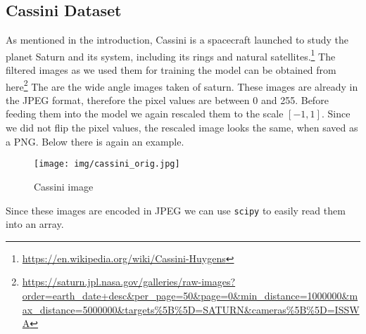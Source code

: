 \subsection{Cassini Dataset}
%
As mentioned in the introduction, Cassini is a spacecraft launched to study the planet Saturn and its system, including its rings and natural satellites.\footnote{\url{https://en.wikipedia.org/wiki/Cassini-Huygens}}
%
The filtered images as we used them for training the model can be obtained from here\footnote{\url{https://saturn.jpl.nasa.gov/galleries/raw-images?order=earth_date+desc&per_page=50&page=0&min_distance=1000000&max_distance=5000000&targets\%5B\%5D=SATURN&cameras\%5B\%5D=ISSWA}}
%
The are the wide angle images taken of saturn.
%
These images are already in the JPEG format, therefore the pixel values are between 0 and 255.
%
Before feeding them into the model we again rescaled them to the scale $[-1, 1]$.
%
Since we did not flip the pixel values, the rescaled image looks the same, when saved as a PNG.
%
Below there is again an example.
%
\begin{figure}[H]
	\centering
	\begin{minipage}{0.45\textwidth}
		\centering
		\texttt{[image: img/cassini\_orig.jpg]}
    	\caption{Cassini image}
	\end{minipage}
\end{figure}
%
Since these images are encoded in JPEG we can use \texttt{scipy} to easily read them into an array.
